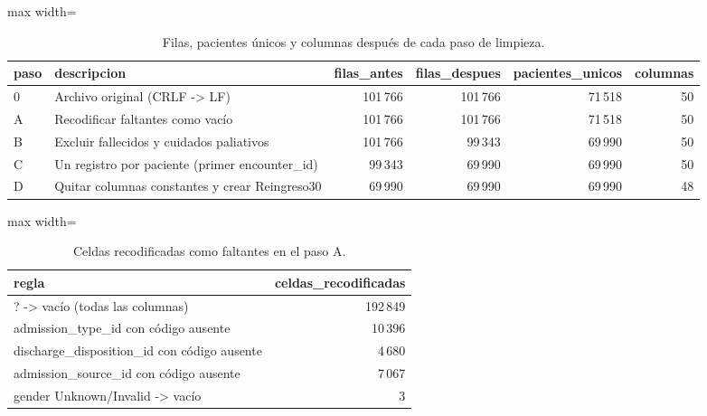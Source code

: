 \documentclass[11pt,a4paper]{article}
\newenvironment{tablaentex}[2]{%
  \begin{table}[H]\centering\small\caption{#1}\label{#2}\begin{adjustbox}{max width=\textwidth}}%
  {\end{adjustbox}\end{table}}
\begin{document}
\begin{tablaentex}{Filas, pacientes únicos y columnas después de cada paso de limpieza.}{tab:pasos}
\begin{tabular}{llrrrr}
\toprule
paso & descripcion & filas\_antes & filas\_despues & pacientes\_unicos & columnas \\
\midrule
0 & Archivo original (CRLF -\textgreater{} LF) & 101\,766 & 101\,766 & 71\,518 & 50 \\
A & Recodificar faltantes como vacío & 101\,766 & 101\,766 & 71\,518 & 50 \\
B & Excluir fallecidos y cuidados paliativos & 101\,766 & 99\,343 & 69\,990 & 50 \\
C & Un registro por paciente (primer encounter\_id) & 99\,343 & 69\,990 & 69\,990 & 50 \\
D & Quitar columnas constantes y crear Reingreso30 & 69\,990 & 69\,990 & 69\,990 & 48 \\
\bottomrule
\end{tabular}
\end{tablaentex}
\begin{tablaentex}{Celdas recodificadas como faltantes en el paso A.}{tab:recod}
\begin{tabular}{lr}
\toprule
regla & celdas\_recodificadas \\
\midrule
? -\textgreater{} vacío (todas las columnas) & 192\,849 \\
admission\_type\_id con código ausente & 10\,396 \\
discharge\_disposition\_id con código ausente & 4\,680 \\
admission\_source\_id con código ausente & 7\,067 \\
gender Unknown/Invalid -\textgreater{} vacío & 3 \\
\bottomrule
\end{tabular}
\end{tablaentex}
\end{document}
